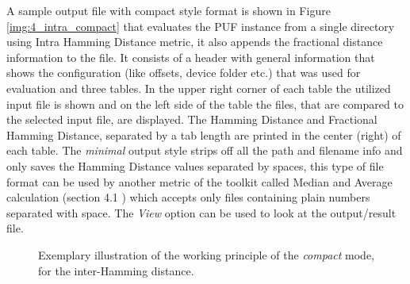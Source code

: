 A sample output file with compact style format is shown in Figure \ref{img:4_intra_compact} that evaluates the PUF instance from a single directory using Intra Hamming Distance metric, it also appends the fractional distance information to the file. It consists of a header with general information that shows the configuration (like offsets, device folder etc.) that was used for evaluation and three tables. In the upper right corner of each table the utilized input file is shown and on the left side of the table
the files, that are compared to the selected input file, are displayed. The Hamming Distance and Fractional Hamming Distance, separated by a tab length are printed in the center (right) of each table. The
\emph{minimal} output style strips off all the path and filename info and only saves the Hamming Distance values separated by spaces, this type of file format can be used by another metric of the toolkit called Median and Average calculation (section 4.1 \cite{71}) which accepts only files containing plain numbers separated with space. The \emph{View} option can be used to look at the output/result file.\\


\begin{figure}
\centering
{}
\caption{Exemplary illustration of the working principle of the \emph{compact} mode, for the inter-Hamming distance.}
\label{img:inter_compact}
\end{figure}

